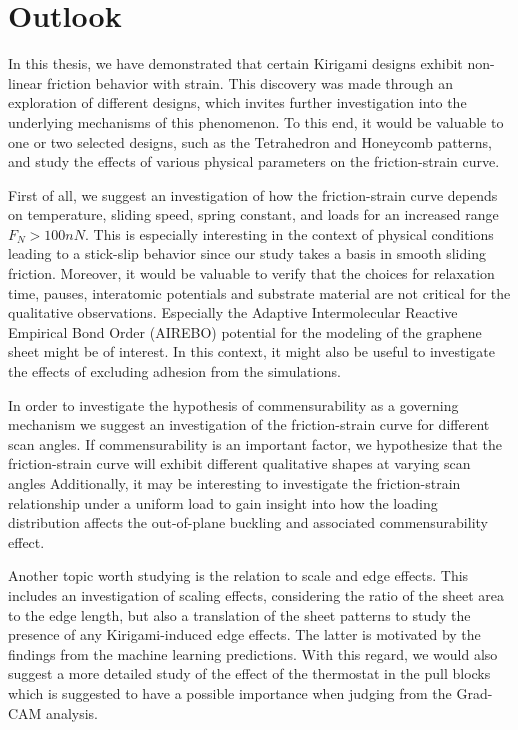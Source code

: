 \section{Outlook}
In this thesis, we have demonstrated that certain Kirigami designs exhibit non-linear friction behavior with strain. This discovery was made through an exploration of different designs, which invites further investigation into the underlying mechanisms of this phenomenon. To this end, it would be valuable to one or two selected designs, such as the Tetrahedron and Honeycomb patterns, and study the effects of various physical parameters on the friction-strain curve.

First of all, we suggest an investigation of how the friction-strain curve
depends on temperature, sliding speed, spring constant, and loads for an
increased range $F_N > 100 nN$. This is especially interesting in the context of
physical conditions leading to a stick-slip behavior since our study takes a
basis in smooth sliding friction. Moreover, it would be valuable to verify that
the choices for relaxation time, pauses, interatomic potentials and substrate
material are not critical for the qualitative observations. Especially the
Adaptive Intermolecular Reactive Empirical Bond Order (AIREBO) potential for the
modeling of the graphene sheet might be of interest. In this context, it might
also be useful to investigate the effects of excluding adhesion from the
simulations. 

In order to investigate the hypothesis of commensurability as a governing mechanism we suggest an investigation of the friction-strain curve for different scan angles. 
If commensurability is an important factor, we hypothesize that the friction-strain curve will exhibit different qualitative shapes at varying scan angles Additionally, it may be interesting to investigate the friction-strain relationship under a uniform load to gain insight into how the loading distribution affects the out-of-plane buckling and associated commensurability effect.

Another topic worth studying is the relation to scale and edge effects. This includes an investigation of scaling effects, considering the ratio of the sheet area to the edge length, but also a translation of the sheet patterns to study the presence of any Kirigami-induced edge effects. The latter is motivated by the findings from the machine learning predictions. With this regard, we would also suggest a more detailed study of the effect of the thermostat in the pull blocks which is suggested to have a possible importance when judging from the Grad-CAM analysis. 

